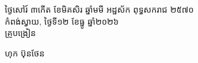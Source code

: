 \documentclass[a4paper,10pt]{article}
\begin{document}
\vspace{16pt}
\hfill
\begin{minipage}{9.8cm}
  {\centering
    ថ្ងៃសៅរ៍ ៣កើត ខែមិគសិរ ឆ្នាំមមី អដ្ឋស័ក ពុទ្ធសករាជ ២៥៧០\\[3pt]
    កំពង់ស្វាយ, ថ្ងៃទី១២ ខែធ្នូ ឆ្នាំ២០២៦\\[4pt]
    {\muol គ្រូបង្រៀន}\par}
  \vspace{34pt}
  \hfill{\muol ហុក ប៊ុនថែន}\hspace*{1.4cm}
\end{minipage}
\end{document}
